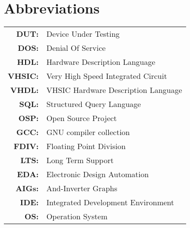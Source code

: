 \renewcommand{\baselinestretch}{1}
\chapter{Abbreviations}

\begin{tabular}{rl}
  \vspace{0.1em} \textbf{DUT:} & Device Under Testing \\
  \vspace{0.1em} \textbf{DOS:} & Denial Of Service\\
  \vspace{0.1em} \textbf{HDL:} & Hardware Description Language\\
  \vspace{0.1em} \textbf{VHSIC:} & Very High Speed Integrated Circuit\\
  \vspace{0.1em} \textbf{VHDL:} & VHSIC Hardware Description Language\\
  \vspace{0.1em} \textbf{SQL:} & Structured Query Language\\
  \vspace{0.1em} \textbf{OSP:} & Open Source Project\\
  \vspace{0.1em} \textbf{GCC:} & GNU compiler collection\\
  \vspace{0.1em} \textbf{FDIV:} & Floating Point Division\\
  \vspace{0.1em} \textbf{LTS:} & Long Term Support\\
  \vspace{0.1em} \textbf{EDA:} & Electronic Design Automation\\
  \vspace{0.1em} \textbf{AIGs:} & And-Inverter Graphs\\
  \vspace{0.1em} \textbf{IDE:} &  Integrated Development Environment\\
  \vspace{0.1em} \textbf{OS:} & Operation System\\
\end{tabular}
